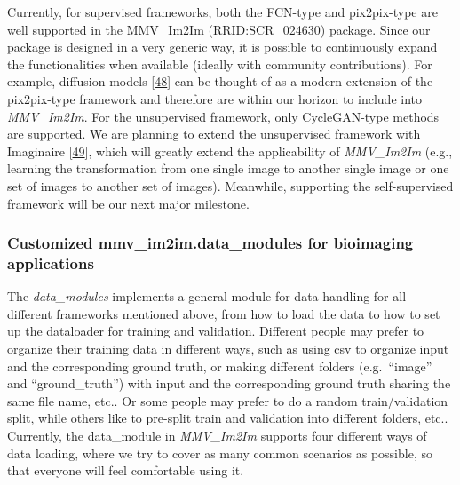 Currently, for supervised frameworks, both the FCN-type and pix2pix-type are well supported in the MMV\_Im2Im (RRID:SCR\_024630) package. Since our package is designed in a very generic way, it is possible to continuously expand the functionalities when available (ideally with community contributions). For example, diffusion models {[}\protect\hyperlink{ref-1A3yurr7m}{48}{]} can be thought of as a modern extension of the pix2pix-type framework and therefore are within our horizon to include into \emph{MMV\_Im2Im}. For the unsupervised framework, only CycleGAN-type methods are supported. We are planning to extend the unsupervised framework with Imaginaire {[}\protect\hyperlink{ref-vzOBQiEH}{49}{]}, which will greatly extend the applicability of \emph{MMV\_Im2Im} (e.g., learning the transformation from one single image to another single image or one set of images to another set of images). Meanwhile, supporting the self-supervised framework will be our next major milestone.

\hypertarget{customized-mmv_im2im.data_modules-for-bioimaging-applications}{%
\subsubsection{Customized mmv\_im2im.data\_modules for bioimaging applications}\label{customized-mmv_im2im.data_modules-for-bioimaging-applications}}

The \emph{data\_modules} implements a general module for data handling for all different frameworks mentioned above, from how to load the data to how to set up the dataloader for training and validation. Different people may prefer to organize their training data in different ways, such as using csv to organize input and the corresponding ground truth, or making different folders (e.g.~``image'' and ``ground\_truth'') with input and the corresponding ground truth sharing the same file name, etc.. Or some people may prefer to do a random train/validation split, while others like to pre-split train and validation into different folders, etc.. Currently, the data\_module in \emph{MMV\_Im2Im} supports four different ways of data loading, where we try to cover as many common scenarios as possible, so that everyone will feel comfortable using it.

